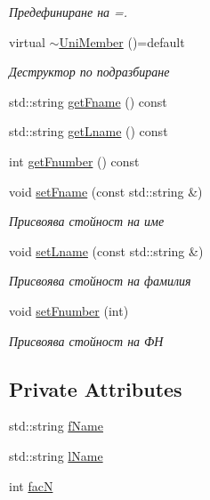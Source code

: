 \begin{DoxyCompactItemize}
\begin{DoxyCompactList}\small\item\em Предефиниране на =. \end{DoxyCompactList}\item 
virtual \hyperlink{class_uni_member_a6b68bae0efeb222dc9613ebe84870331}{$\sim$\+Uni\+Member} ()=default
\begin{DoxyCompactList}\small\item\em Деструктор по подразбиране \end{DoxyCompactList}\item 
std\+::string \hyperlink{class_uni_member_ae954a856ad320eff703c3efe312ebece}{get\+Fname} () const
\item 
std\+::string \hyperlink{class_uni_member_a312319a40d4a1d1a7c2667121a6f3469}{get\+Lname} () const
\item 
int \hyperlink{class_uni_member_ab1de8aa08354456fafb30a946564e6c4}{get\+Fnumber} () const
\item 
void \hyperlink{class_uni_member_afe68f8430ad033de7f87960946e29038}{set\+Fname} (const std\+::string \&)
\begin{DoxyCompactList}\small\item\em Присвоява стойност на име \end{DoxyCompactList}\item 
void \hyperlink{class_uni_member_a345f73ca3ae57f45643552ba1d01a02e}{set\+Lname} (const std\+::string \&)
\begin{DoxyCompactList}\small\item\em Присвоява стойност на фамилия \end{DoxyCompactList}\item 
void \hyperlink{class_uni_member_ad979c7e5a0fe22e5928c8cc71964a8e2}{set\+Fnumber} (int)
\begin{DoxyCompactList}\small\item\em Присвоява стойност на ФН \end{DoxyCompactList}\end{DoxyCompactItemize}
\subsection*{Private Attributes}
\begin{DoxyCompactItemize}
\item 
std\+::string \hyperlink{class_uni_member_a5f7b13ce8bdca84434a9efe78b6c7fcc}{f\+Name}
\item 
std\+::string \hyperlink{class_uni_member_a8a67cfc2e07415052346918f915aeca6}{l\+Name}
\item 
int \hyperlink{class_uni_member_aa4eab80b1f944ae3a2ff150db313ecb4}{facN}
\end{DoxyCompactItemize}


